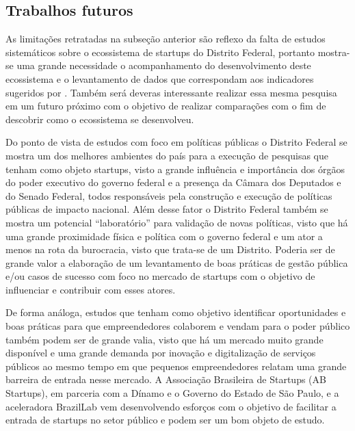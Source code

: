 \subsection{Trabalhos futuros}
\label{subsection:trabalhos_futuros}

As limitações retratadas na subseção anterior são reflexo da falta de estudos sistemáticos sobre o ecossistema de startups do Distrito Federal, portanto mostra-se uma grande necessidade o acompanhamento do desenvolvimento deste ecossistema e o levantamento de dados que correspondam aos indicadores sugeridos por . Também será deveras interessante realizar essa mesma pesquisa em um futuro próximo com o objetivo de realizar comparações com o fim de descobrir como o ecossistema se desenvolveu.

Do ponto de vista de estudos com foco em políticas públicas o Distrito Federal se mostra um dos melhores ambientes do país para a execução de pesquisas que tenham como objeto startups, visto a grande influência e importância dos órgãos do poder executivo do governo federal e a presença da Câmara dos Deputados e do Senado Federal, todos responsáveis pela construção e execução de políticas públicas de impacto nacional. Além desse fator o Distrito Federal também se mostra um potencial ``laboratório'' para validação de novas políticas, visto que há uma grande proximidade física e política com o governo federal e um ator a menos na rota da burocracia, visto que trata-se de um Distrito. Poderia ser de grande valor a elaboração de um levantamento de boas práticas de gestão pública e/ou casos de sucesso com foco no mercado de startups com o objetivo de influenciar e contribuir com esses atores. 

De forma análoga, estudos que tenham como objetivo identificar oportunidades e boas práticas para que empreendedores colaborem e vendam para o poder público também podem ser de grande valia, visto que há um mercado muito grande disponível e uma grande demanda por inovação e digitalização de serviços públicos ao mesmo tempo em que pequenos empreendedores relatam uma grande barreira de entrada nesse mercado. A Associação Brasileira de Startups (AB Startups), em parceria com a Dínamo e o Governo do Estado de São Paulo, e a aceleradora BrazilLab vem desenvolvendo esforços com o objetivo de facilitar a entrada de startups no setor público e podem ser um bom objeto de estudo.